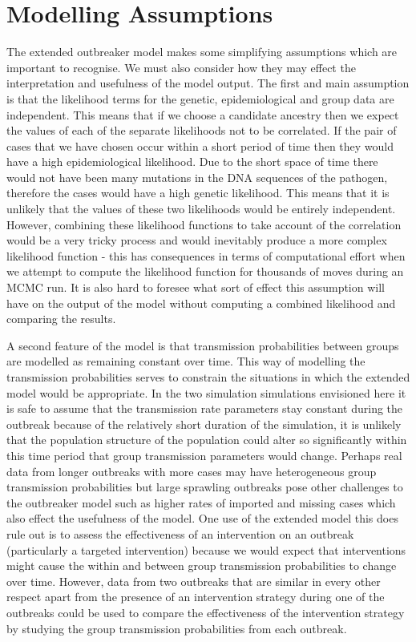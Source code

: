 \documentclass[11pt,a4paper]{report}
\begin{document}
\section{Modelling Assumptions}
The extended outbreaker model makes some simplifying assumptions which are important to recognise. We must also consider how they may effect the interpretation and usefulness of the model output. The first and main assumption is that the likelihood terms for the genetic, epidemiological and group data are independent. This means that if we choose a candidate ancestry then we expect the values of each of the separate likelihoods not to be correlated. If the pair of cases that we have chosen occur within a short period of time then they would have a high epidemiological likelihood. Due to the short space of time there would not have been many mutations in the DNA sequences of the pathogen, therefore the cases would have a high genetic likelihood. This means that it is unlikely that the values of these two likelihoods would be entirely independent. However, combining these likelihood functions to take account of the correlation would be a very tricky process and would inevitably produce a more complex likelihood function - this has consequences in terms of computational effort when we attempt to compute the likelihood function for thousands of moves during an MCMC run. It is also hard to foresee what sort of effect this assumption will have on the output of the model without computing a combined likelihood and comparing the results.

A second feature of the model is that transmission probabilities between groups are modelled as remaining constant over time. This way of modelling the transmission probabilities serves to constrain the situations in which the extended model would be appropriate. In the two simulation simulations envisioned here it is safe to assume that the transmission rate parameters stay constant during the outbreak because of the relatively short duration of the simulation, it is unlikely that the population structure of the population could alter so significantly within this time period that group transmission parameters would change. Perhaps real data from longer outbreaks with more cases may have heterogeneous group transmission probabilities but large sprawling outbreaks pose other challenges to the outbreaker model such as higher rates of imported and missing cases which also effect the usefulness of the model. One use of the extended model this does rule out is to assess the effectiveness of an intervention on an outbreak (particularly a targeted intervention) because we would expect that interventions might cause the within and between group transmission probabilities to change over time. However, data from two outbreaks that are similar in every other respect apart from the presence of an intervention strategy during one of the outbreaks could be used to compare the effectiveness of the intervention strategy by studying the group transmission probabilities from each outbreak.
\end{document}
